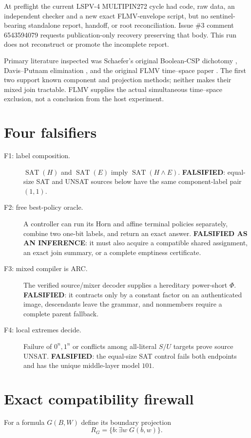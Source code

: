 \documentclass[11pt]{article}
\begin{document}
At preflight the current LSPV-4 MULTIPIN272 cycle had code, raw data, an
independent checker and a new exact FLMV-envelope script, but no sentinel-bearing
standalone report, handoff, or root reconciliation.  Issue \#3 comment
6543594079 requests publication-only recovery preserving that body.  This run
does not reconstruct or promote the incomplete report.

Primary literature inspected was Schaefer's original Boolean-CSP dichotomy
\cite{schaefer}, Davis--Putnam elimination \cite{dp}, and the original FLMV
time--space paper \cite{flmv}.  The first two support known component and
projection methods; neither makes their mixed join tractable.  FLMV supplies
the actual simultaneous time--space exclusion, not a conclusion from the host
experiment.

\section{Four falsifiers}
\begin{description}
\item[F1: label composition.] $\operatorname{SAT}(H)$ and
$\operatorname{SAT}(E)$ imply $\operatorname{SAT}(H\wedge E)$.
\textbf{FALSIFIED}: equal-size SAT and UNSAT sources below have the same
component-label pair $(1,1)$.
\item[F2: free best-policy oracle.] A controller can run its Horn and affine
terminal policies separately, combine two one-bit labels, and return an exact
answer.  \textbf{FALSIFIED AS AN INFERENCE}: it must also acquire a compatible
shared assignment, an exact join summary, or a complete emptiness certificate.
\item[F3: mixed compiler is ARC.] The verified source/mixer decoder supplies a
hereditary power-short $\Phi$.  \textbf{FALSIFIED}: it contracts only by a
constant factor on an authenticated image, descendants leave the grammar, and
nonmembers require a complete parent fallback.
\item[F4: local extremes decide.] Failure of $0^n,1^n$ or conflicts among
all-literal $S/U$ targets prove source UNSAT.  \textbf{FALSIFIED}: the equal-size
SAT control fails both endpoints and has the unique middle-layer model $101$.
\end{description}

\section{Exact compatibility firewall}
For a formula $G(B,W)$ define its boundary projection
\[
 R_G=\{b:\exists w\;G(b,w)\}.
\]
\end{document}
